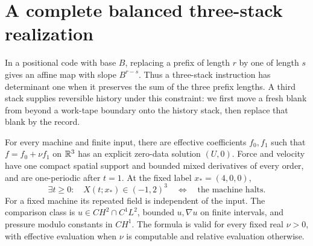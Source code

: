 \section{A complete balanced three-stack realization}\label{sec:bb-balanced-three-stack}

In a positional code with base $B$, replacing a prefix of length $r$
by one of length $s$ gives an affine map with slope $B^{r-s}$.
Thus a three-stack instruction has determinant one when it preserves
the sum of the three prefix lengths.  A third stack supplies reversible
history under this constraint: we first move a fresh blank from beyond
a work-tape boundary onto the history stack, then replace that blank
by the record.

\begin{theorem}
\label{thm:bb-balanced-three-stack}
For every machine and finite input, there are effective coefficients
$f_0,f_1$ such that $f=f_0+\nu f_1$ on $\mathbb R^3$ has an explicit
zero-data solution $(U,0)$.  Force and velocity have one compact
spatial support and bounded mixed derivatives of every order, and
are one-periodic after $t=1$.  At the fixed label $x_*=(4,0,0)$,
\[
 \exists t\ge0:\quad X(t;x_*)\in(-1,2)^3
 \quad\Longleftrightarrow\quad\text{the machine halts}.
\]
For a fixed machine its repeated field is independent of the input.
The comparison class is $u\in C H^2\cap C^1L^2$, bounded $u,\nabla u$
on finite intervals, and pressure modulo constants in $C H^1$.
The formula is valid for every fixed real $\nu>0$, with effective
evaluation when $\nu$ is computable and relative evaluation otherwise.
\end{theorem}
